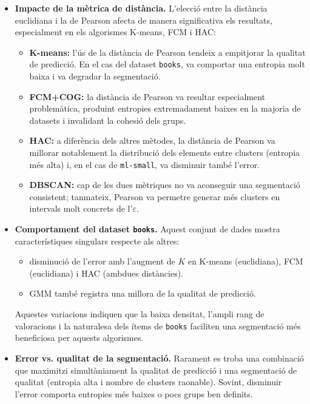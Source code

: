\documentclass[a4paper,12pt]{report}
\begin{document}
\begin{itemize}
  \item \textbf{Impacte de la mètrica de distància.}
    L’elecció entre la distància euclidiana i la de Pearson afecta de manera significativa els resultats, especialment en els algorismes K-means, FCM i HAC:
    \begin{itemize}
      \item \textbf{K-means:} l’ús de la distància de Pearson tendeix a empitjorar la qualitat de predicció. En el cas del dataset \texttt{books}, va comportar una entropia molt baixa i va degradar la segmentació.
      \item \textbf{FCM+COG:} la distància de Pearson va resultar especialment problemàtica, produint entropies extremadament baixes en la majoria de datasets i invalidant la cohesió dels grups.
      \item \textbf{HAC:} a diferència dels altres mètodes, la distància de Pearson va millorar notablement la distribució dels elements entre clusters (entropia més alta) i, en el cas de \texttt{ml-small}, va disminuir també l'error.
      \item \textbf{DBSCAN:} cap de les dues mètriques no va aconseguir una segmentació consistent; tanmateix, Pearson va permetre generar més clusters en intervals molt concrets de l’\(\varepsilon\).
    \end{itemize}

  \item \textbf{Comportament del dataset \texttt{books}.}
    Aquest conjunt de dades mostra característiques singulars respecte als altres:
    \begin{itemize}
      \item disminució de l'error amb l’augment de \(K\) en K-means (euclidiana), FCM (euclidiana) i HAC (ambdues distàncies).
      \item GMM també registra una millora de la qualitat de predicció.
    \end{itemize}
    Aquestes variacions indiquen que la baixa densitat, l’ampli rang de valoracions i la naturalesa dels ítems de \texttt{books} faciliten una segmentació més beneficiosa per aquests algorismes.

  \item \textbf{Error vs. qualitat de la segmentació.}
    Rarament es troba una combinació que maximitzi simultàniament la qualitat de predicció i una segmentació de qualitat (entropia alta i nombre de clusters raonable). Sovint, disminuir l'error comporta entropies més baixes o pocs grups ben definits.


\end{itemize}
\end{document}
